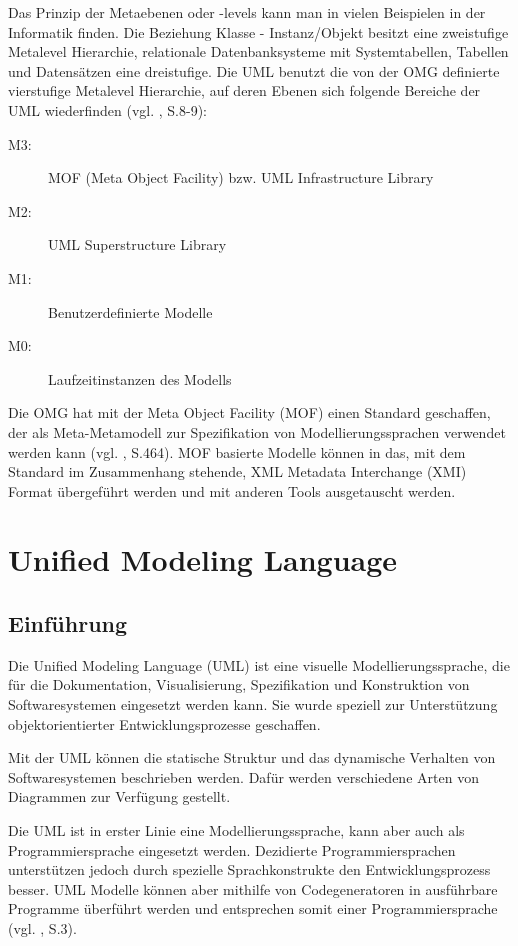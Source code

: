 

Das Prinzip der Metaebenen oder -levels kann man in vielen Beispielen in der Informatik finden. Die Beziehung Klasse - Instanz/Objekt besitzt eine zweistufige Metalevel Hierarchie, relationale Datenbanksysteme mit Systemtabellen, Tabellen und Datensätzen eine dreistufige. Die UML benutzt die von der OMG definierte vierstufige Metalevel Hierarchie, auf deren Ebenen sich folgende Bereiche der UML wiederfinden (vgl. \citep{OMG2006}, S.8-9):
\begin{description}
\item[M3:] MOF (Meta Object Facility) bzw. UML Infrastructure Library
\item[M2:] UML Superstructure Library
\item[M1:] Benutzerdefinierte Modelle
\item[M0:] Laufzeitinstanzen des Modells
\end{description}

Die OMG hat mit der Meta Object Facility (MOF) einen Standard geschaffen, der als Meta-Metamodell zur Spezifikation von Modellierungssprachen verwendet werden kann (vgl. \citep{RumbaughJacobsonBooch2005}, S.464). MOF basierte Modelle können in das, mit dem Standard im Zusammenhang stehende, XML Metadata Interchange (XMI) Format übergeführt werden und mit anderen Tools ausgetauscht werden.

\section{Unified Modeling Language}

\subsection{Einführung}
Die Unified Modeling Language (UML) ist eine visuelle Modellierungssprache, die für die Dokumentation, Visualisierung, Spezifikation und Konstruktion von Softwaresystemen eingesetzt werden kann. Sie wurde speziell zur Unterstützung objektorientierter Entwicklungsprozesse geschaffen.

Mit der UML können die statische Struktur und das dynamische Verhalten von Softwaresystemen beschrieben werden. Dafür werden verschiedene Arten von Diagrammen zur Verfügung gestellt.

Die UML ist in erster Linie eine Modellierungssprache, kann aber auch als Programmiersprache eingesetzt werden. Dezidierte Programmiersprachen unterstützen jedoch durch spezielle Sprachkonstrukte den Entwicklungsprozess besser. UML Modelle können aber mithilfe von Codegeneratoren in ausführbare Programme überführt werden und entsprechen somit einer Programmiersprache (vgl. \citep{RumbaughJacobsonBooch2005}, S.3).


